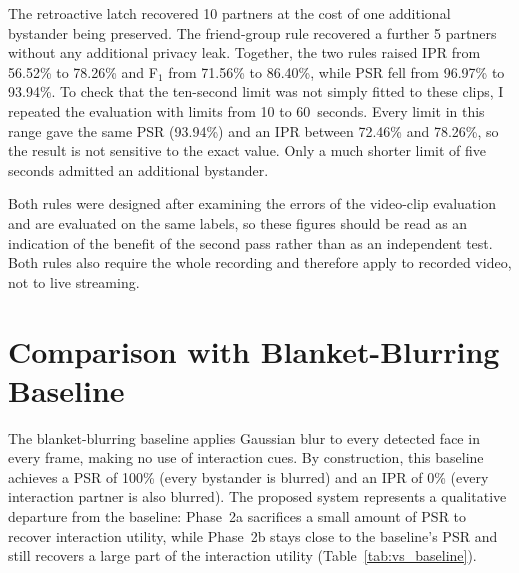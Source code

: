 The retroactive latch recovered 10 partners at the cost of one additional
bystander being preserved. The friend-group rule recovered a further 5 partners
without any additional privacy leak. Together, the two rules raised IPR from 56.52\%
to 78.26\% and F$_1$ from 71.56\% to 86.40\%, while PSR fell from 96.97\% to 93.94\%.
To check that the ten-second limit was not simply fitted to these clips, I repeated
the evaluation with limits from 10 to 60~seconds. Every limit in this range gave the
same PSR (93.94\%) and an IPR between 72.46\% and 78.26\%, so the result is not
sensitive to the exact value. Only a much shorter limit of five seconds admitted an
additional bystander.

Both rules were designed after examining the errors of the video-clip evaluation and
are evaluated on the same labels, so these figures should be read as an indication
of the benefit of the second pass rather than as an independent test. Both rules
also require the whole recording and therefore apply to recorded video, not to
live streaming.

\section{Comparison with Blanket-Blurring Baseline}
\label{sec:baseline_comparison}

The blanket-blurring baseline applies Gaussian blur to every detected face in every
frame, making no use of interaction cues. By construction, this baseline achieves a
PSR of 100\% (every bystander is blurred) and an IPR of 0\% (every interaction
partner is also blurred). The proposed system represents a qualitative departure
from the baseline: Phase~2a sacrifices a small amount of PSR to recover interaction
utility, while Phase~2b stays close to the baseline's PSR and still recovers a
large part of the interaction utility (Table~\ref{tab:vs_baseline}).


